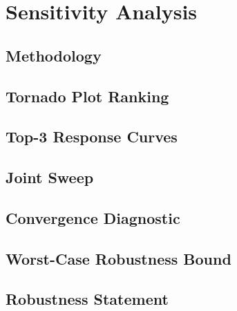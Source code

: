 \section{Sensitivity Analysis} 

\subsection{Methodology}

\subsection{Tornado Plot Ranking}

\subsection{Top-3 Response Curves}

\subsection{Joint Sweep}

\subsection{Convergence Diagnostic}

\subsection{Worst-Case Robustness Bound}

\subsection{Robustness Statement}